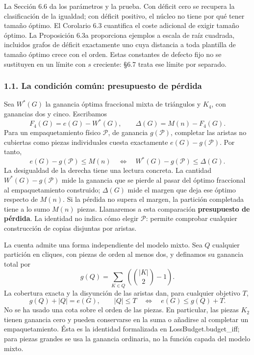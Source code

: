 \documentclass[spanish,11pt,a4paper]{article}
\begin{document}
La Sección 6.6 da los parámetros y la prueba. Con déficit cero se recupera la clasificación de la igualdad; con déficit positivo, el núcleo no tiene por qué tener tamaño óptimo. El Corolario 6.3 cuantifica el coste adicional de exigir tamaño óptimo. La Proposición 6.3a proporciona ejemplos a escala de raíz cuadrada, incluidos grafos de déficit exactamente uno cuya distancia a toda plantilla de tamaño óptimo crece con el orden. Estas constantes de defecto fijo no se sustituyen en un límite con \(s\) creciente: §6.7 trata ese límite por separado.

\subsubsection{1.1. La condición común: presupuesto de pérdida}\label{la-condicion-comun-presupuesto-de-perdida}

Sea \(W^*(G)\) la ganancia óptima fraccional mixta de triángulos y \(K_4\), con ganancias dos y cinco. Escribamos \[
F_4(G)=e(G)-W^*(G),\qquad \Delta(G)=M(n)-F_4(G).
\] Para un empaquetamiento físico \(\mathcal P\), de ganancia \(g(\mathcal P)\), completar las aristas no cubiertas como piezas individuales cuesta exactamente \(e(G)-g(\mathcal P)\). Por tanto, \[
\boxed{
e(G)-g(\mathcal P)\le M(n)
\quad\Longleftrightarrow\quad
W^*(G)-g(\mathcal P)\le\Delta(G).
}
\tag{1.3}
\] La desigualdad de la derecha tiene una lectura concreta. La cantidad \(W^*(G)-g(\mathcal P)\) mide la ganancia que se pierde al pasar del óptimo fraccional al empaquetamiento construido; \(\Delta(G)\) mide el margen que deja ese óptimo respecto de \(M(n)\). Si la pérdida no supera el margen, la partición completada tiene a lo sumo \(M(n)\) piezas. Llamaremos a esta comparación \textbf{presupuesto de pérdida}. La identidad no indica cómo elegir \(\mathcal P\): permite comprobar cualquier construcción de copias disjuntas por aristas.

La cuenta admite una forma independiente del modelo mixto. Sea \(Q\) cualquier partición en cliques, con piezas de orden al menos dos, y definamos su ganancia total por \[
g(Q)=\sum_{K\in Q}\left(\binom{|K|}{2}-1\right).
\] La cobertura exacta y la disyunción de las aristas dan, para cualquier objetivo \(T\), \[
g(Q)+|Q|=e(G),\qquad
|Q|\le T\quad\Longleftrightarrow\quad e(G)\le g(Q)+T.
\tag{1.3a}
\] No se ha usado una cota sobre el orden de las piezas. En particular, las piezas \(K_2\) tienen ganancia cero y pueden conservarse en la suma o añadirse al completar un empaquetamiento. Ésta es la identidad formalizada en {\ttfamily\small LossBudget.\discretionary{\hbox{\ensuremath{\hookrightarrow}}}{}{}budget\_\discretionary{\hbox{\ensuremath{\hookrightarrow}}}{}{}iff}; para piezas grandes se usa la ganancia ordinaria, no la función capada del modelo mixto.
\end{document}
